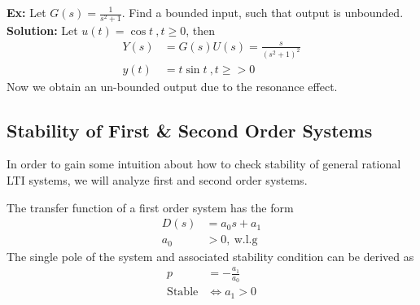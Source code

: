 \documentclass[twoside]{article}
\begin{document}
\textbf{Ex:} Let $G(s) = \frac{1}{s^2 + 1}$. Find a
bounded input, such that output is unbounded.
%
\textbf{Solution:} Let $u(t) = \cos t \ , t \geq 0$, then
%
\begin{align*}
  Y(s) &= G(s) U(s) = \frac{s}{(s^2+1)^2}
  \\
  y(t) &= t \sin t \ , t \geq > 0
\end{align*}
%
Now we obtain an un-bounded output due to the resonance effect. 

\subsection{Stability of First \& Second Order Systems}

In order to gain some intuition about how to check stability
of general rational LTI systems, we will analyze first and second order
systems. 

The transfer function of a first order system has the form
%
\begin{align*}
  D(s) &= a_0 s + a_1 \\
 a_0 &> 0 , \ \mathrm{w.l.g}
\end{align*}
%
The single pole of the system and associated stability condition 
can be derived as
%
\begin{align*}
  p &= -\frac{a_1}{a_0}
 \\
  \mathrm{Stable} &\Leftrightarrow a_1 > 0
\end{align*}
\end{document}
